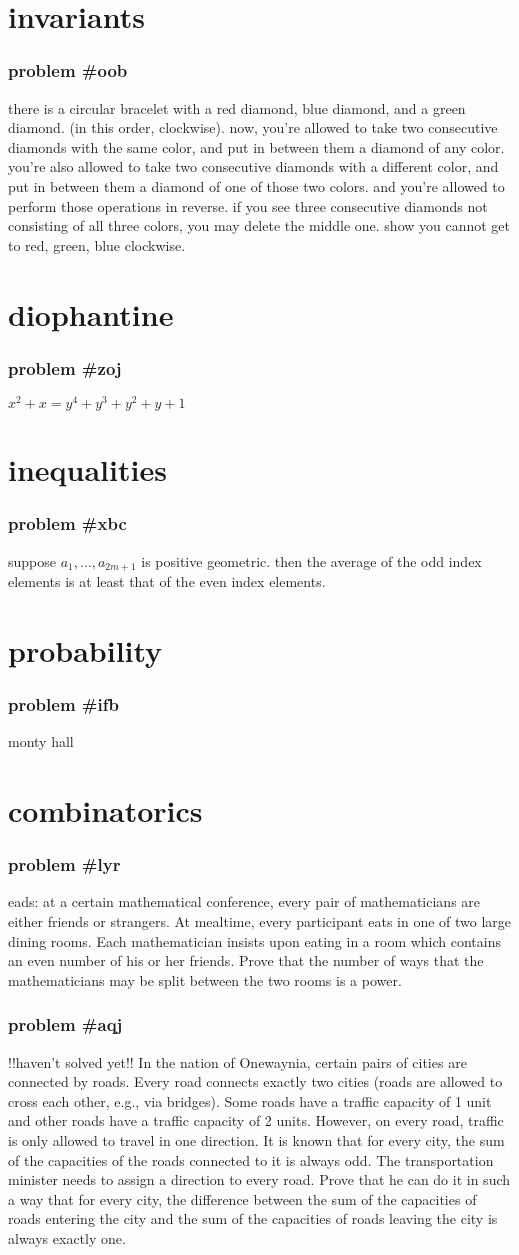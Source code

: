 \documentclass{article}
\newcommand{\problem}[1]{\subsubsection*{\textbf{problem \##1}}}
\newcommand{\chapter}[1]{\section*{#1}}
\begin{document}
\chapter{invariants}
\problem{oob} there is a circular bracelet with a red diamond, blue diamond, and a green diamond. (in this order, clockwise). now, you're allowed to take two consecutive diamonds with the same color, and put in between them a diamond of any color. you're also allowed to take two consecutive diamonds with a different color, and put in between them a diamond of one of those two colors. and you're allowed to perform those operations in reverse. if you see three consecutive diamonds not consisting of all three colors, you may delete the middle one. show you cannot get to red, green, blue clockwise.
\chapter{diophantine}
\problem{zoj} $x^2+x=y^4+y^3+y^2+y+1$
\chapter{inequalities}
\problem{xbc} suppose $a_1,\dots,a_{2m+1}$ is positive geometric. then the average of the odd index elements is at least that of the even index elements.
\chapter{probability}
\problem{ifb} monty hall
\chapter{combinatorics}
\problem{lyr} eads: at a certain mathematical conference, every pair of mathematicians are either friends or strangers.
At mealtime, every participant eats in one of two large dining rooms. Each mathematician insists upon eating in a room which contains an even number of his or her friends. Prove that the number of ways that the mathematicians may be split between the two rooms is a power.
\problem{aqj} !!haven't solved yet!! In the nation of Onewaynia, certain pairs of cities are connected by roads. Every road connects exactly two cities (roads are allowed to cross each other, e.g., via bridges). Some roads have a traffic capacity of 1 unit and other roads have a traffic capacity of 2 units. However, on every road, traffic is only allowed to travel in one direction. It is known that for every city, the sum of the capacities of the roads connected to it is always odd. The transportation minister needs to assign a direction to every road. Prove that he can do it in such a way that for every city, the difference between the sum of the capacities of roads entering the city and the sum of the capacities of roads leaving the city is always exactly one.
\end{document}
